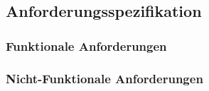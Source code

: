 \subsection{Anforderungsspezifikation}

\subsubsection{Funktionale Anforderungen}

\subsubsection{Nicht-Funktionale Anforderungen}